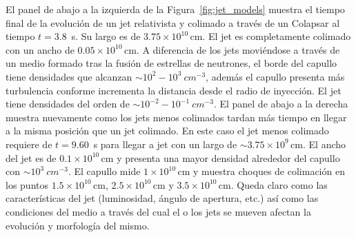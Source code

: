 \documentclass[12pt,a4paper]{book}
\begin{document}
El panel de abajo a la izquierda de la Figura~\ref{fig:jet_models} muestra el tiempo final de la evolución de un jet relativista y colimado a través de un Colapsar al tiempo $t = 3.8$~s. Su largo es de
$3.75 \times 10^{10} \, \text{cm}$. El jet es completamente colimado con un ancho de $0.05 \times 10^{10} \, \text{cm}$. A diferencia de los jets moviéndose a través de un medio formado tras la fusión de estrellas de 
neutrones, el borde del capullo tiene densidades que alcanzan $\sim10^{2}-10^{3} ~cm^{-3}$, además el capullo presenta más turbulencia conforme incrementa la distancia desde el radio de inyección. El jet tiene densidades 
del orden de $\sim 10^{-2}-10^{-1} ~cm^{-3}$. El panel de abajo a la derecha muestra nuevamente como los jets menos colimados tardan más tiempo en llegar a la misma posición que un jet colimado. En este caso el jet menos 
colimado requiere de $t = 9.60$~s para llegar a jet con un largo de $\sim 3.75 \times 10^9 \, \text{cm}$. El ancho del jet es de $0.1 \times 10^{10} \, \text{cm}$ y presenta una mayor densidad alrededor
del capullo con $\sim10^{3} ~cm^{-3}$. El capullo mide $1 \times 10^{10} \, \text{cm}$ y muestra choques de colimación en los puntos $1.5 \times 10^{10} \, \text{cm}$, $2.5 \times 10^{10} \, \text{cm}$ 
y $3.5 \times 10^{10} \, \text{cm}$. Queda claro como las características del jet (luminosidad, ángulo de apertura, etc.) así como las condiciones del medio a través del cual el o los jets se mueven afectan la 
evolución y morfología del mismo.
\end{document}
